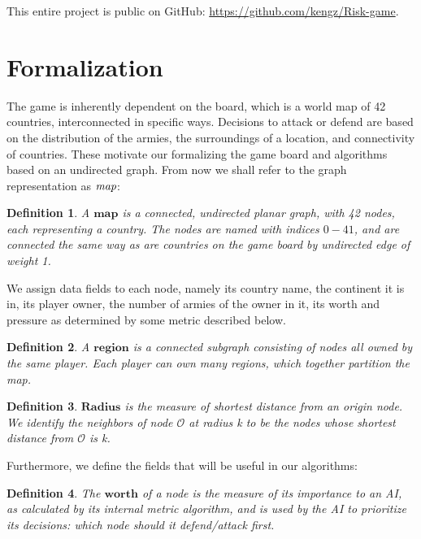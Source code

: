 \documentclass[12pt]{article}  %
\newtheorem{definition}{Definition}
\begin{document}
This entire project is public on GitHub: \url{https://github.com/kengz/Risk-game}.



\section{Formalization} \label{formalization}

The game is inherently dependent on the board, which is a world map of 42 countries, interconnected in specific ways. Decisions to attack or defend are based on the distribution of the armies, the surroundings of a location, and connectivity of countries. These motivate our formalizing the game board and algorithms based on an undirected graph. From now we shall refer to the graph representation as $\emph{map}$:

\begin{definition} \label{map}
A $\textbf{map}$ is a connected, undirected planar graph, with 42 nodes, each representing a country. The nodes are named with indices $0-41$, and are connected the same way as are countries on the game board by undirected edge of weight 1.
\end{definition}

We assign data fields to each node, namely its country name, the continent it is in, its player owner, the number of armies of the owner in it, its worth and pressure as determined by some metric described below.


\begin{definition} \label{region}
A $\textbf{region}$ is a connected subgraph consisting of nodes all owned by the same player. Each player can own many regions, which together partition the map.
\end{definition}

\begin{definition} \label{radius}
$\textbf{Radius}$ is the measure of shortest distance from an origin node. We identify the neighbors of node $\mathcal{O}$ at radius k to be the nodes whose shortest distance from $\mathcal{O}$ is k.
\end{definition}


Furthermore, we define the fields that will be useful in our algorithms:

\begin{definition}
The $\textbf{worth}$ of a node is the measure of its importance to an AI, as calculated by its internal metric algorithm, and is used by the AI to prioritize its decisions: which node should it defend/attack first.
\end{definition}
\end{document}
